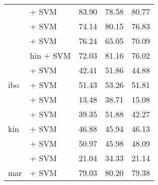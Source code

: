 \begin{longtable}{llccc}
                                       & \citep{wang2024multilingual} + SVM                                 & 83.90                                & 78.58              & 80.77             \\
                                       & \citep{joshi2022l3cubemahasbert} + SVM                             & 74.14                                & 80.15              & 76.83             \\
                                       & \citep{nogueira2019documentexpansionqueryprediction} + SVM         & 76.24                                & 65.05              & 70.09             \\
                                       & \citep{feng2020languageagnostic} hin + SVM                         & 72.03                                & 81.16              & 76.02             \\
    \midrule
    \multirow{3}{*}{ibo}               & \citep{feng2022languageagnosticbertsentenceembedding} + SVM        & 42.41                                & 51.86              & 44.88             \\
                                       & \citep{wang2024multilingual} + SVM                                 & 51.43                                & 53.26              & 51.81             \\
                                       & \citep{oketunji2024pmmlv2finetunedigbo} + SVM                      & 13.48                                & 38.71              & 15.08             \\
    \midrule
    \multirow{3}{*}{kin}               & \citep{feng2022languageagnosticbertsentenceembedding} + SVM        & 39.35                                & 51.88              & 42.27             \\
                                       & \citep{adelani2023bertmultilingualkinyarwanda} + SVM               & 46.88                                & 45.94              & 46.13             \\
                                       & \citep{wang2024multilingual} + SVM                                 & 50.97                                & 45.98              & 48.09             \\
                                       & \citep{adelani2023xlmrobertakinyrwanda} + SVM                      & 21.04                                & 34.33              & 21.14             \\
    \midrule
    mar                                & \citep{wang2024multilingual} + SVM                                 & 79.03                                & 80.20              & 79.38             \\

\end{longtable}

